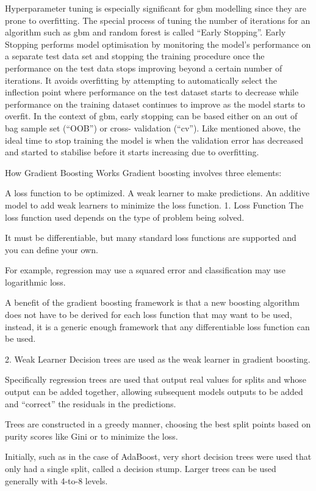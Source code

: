 \documentclass[12pt]{article}
\begin{document}
Hyperparameter tuning is especially significant for gbm modelling since they are prone to overfitting. The special process of tuning the number of iterations for an algorithm such as gbm and random forest is called “Early Stopping”. Early Stopping performs model optimisation by monitoring the model’s performance on a separate test data set and stopping the training procedure once the performance on the test data stops improving beyond a certain number of iterations.
It avoids overfitting by attempting to automatically select the inflection point where performance on the test dataset starts to decrease while performance on the training dataset continues to improve as the model starts to overfit. In the context of gbm, early stopping can be based either on an out of bag sample set (“OOB”) or cross- validation (“cv”). Like mentioned above, the ideal time to stop training the model is when the validation error has decreased and started to stabilise before it starts increasing due to overfitting.

How Gradient Boosting Works
Gradient boosting involves three elements:

A loss function to be optimized.
A weak learner to make predictions.
An additive model to add weak learners to minimize the loss function.
1. Loss Function
The loss function used depends on the type of problem being solved.

It must be differentiable, but many standard loss functions are supported and you can define your own.

For example, regression may use a squared error and classification may use logarithmic loss.

A benefit of the gradient boosting framework is that a new boosting algorithm does not have to be derived for each loss function that may want to be used, instead, it is a generic enough framework that any differentiable loss function can be used.

2. Weak Learner
Decision trees are used as the weak learner in gradient boosting.

Specifically regression trees are used that output real values for splits and whose output can be added together, allowing subsequent models outputs to be added and “correct” the residuals in the predictions.

Trees are constructed in a greedy manner, choosing the best split points based on purity scores like Gini or to minimize the loss.

Initially, such as in the case of AdaBoost, very short decision trees were used that only had a single split, called a decision stump. Larger trees can be used generally with 4-to-8 levels.
\end{document}
